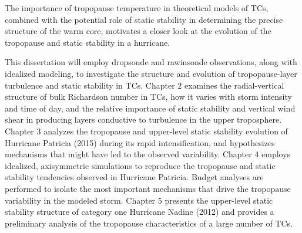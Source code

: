 The importance of tropopause temperature in theoretical models of TCs, combined with the potential role of static stability in determining the precise structure of the warm core, motivates a closer look at the evolution of the tropopause and static stability in a hurricane.

This dissertation will employ dropsonde and rawinsonde observations, along with idealized modeling, to investigate the structure and evolution of tropopause-layer turbulence and static stability in TCs.
Chapter 2 examines the radial-vertical structure of bulk Richardson number in TCs, how it varies with storm intensity and time of day, and the relative importance of static stability and vertical wind shear in producing layers conductive to turbulence in the upper troposphere.
Chapter 3 analyzes the tropopause and upper-level static stability evolution of Hurricane Patricia (2015) during its rapid intensification, and hypothesizes mechanisms that might have led to the observed variability.
Chapter 4 employs idealized, axisymmetric simulations to reproduce the tropopause and static stability tendencies observed in Hurricane Patricia.
Budget analyses are performed to isolate the most important mechanisms that drive the tropopause variability in the modeled storm.
Chapter 5 presents the upper-level static stability structure of category one Hurricane Nadine (2012) and provides a preliminary analysis of the tropopause characteristics of a large number of TCs.

\clearpage


